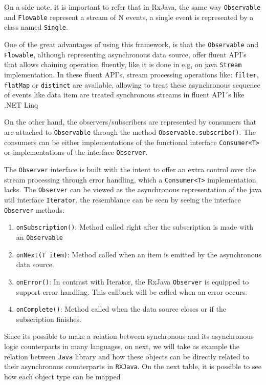On a side note, it is important to refer that in RxJava, the same way \texttt{Observable} and \texttt{Flowable} represent a stream of N events, a single event is represented by a class named \texttt{Single}. 

One of the great advantages of using this framework, is that the \texttt{Observable} and \texttt{Flowable}, although representing asynchronous data source, offer fluent API's that allows chaining operation fluently, like it is done in e.g, on java \texttt{Stream} implementation.
In these fluent API's, stream processing operations like: \texttt{filter}, \texttt{flatMap} or \texttt{distinct} are available, allowing to treat these asynchronous sequence of events like data item are treated synchronous streams in fluent API´s like .NET Linq

On the other hand, the observers/subscribers are represented by consumers that are attached to \texttt{Observable} through the method \texttt{Observable.subscribe()}.
The consumers can be either implementations of the functional interface \texttt{Consumer<T>} or implementations of the interface \texttt{Observer}.

The \texttt{Observer} interface is built with the intent to offer an extra control over the stream processing through error handling, which a \texttt{Consumer<T>} implementation lacks. The \texttt{Observer} can be viewed as the asynchronous representation of the java util interface \texttt{Iterator}, the resemblance can be seen by seeing the interface \texttt{Observer} methods:

\begin{enumerate}
     \item \texttt{onSubscription()}: Method called right after the subscription is made with an \texttt{Observable} 
	 \item \texttt{onNext(T item)}: Method called when an item is emitted by the asynchronous data source.
	 \item \texttt{onError()}: In contrast with Iterator, the RxJava \texttt{Observer} is equipped to support error handling. This callback will be called when an error occurs.
	 \item \texttt{onComplete()}: Method called when the data source closes or if the subscription finishes.
\end{enumerate}	

Since its possible to make a relation between synchronous and its asynchronous logic counterparts in many languages, on next, we will take as example the relation between \texttt{Java} library and how these objects can be directly related to their asynchronous counterparts in \texttt{RXJava}.
On the next table, it is possible to see how each object type can be mapped 

